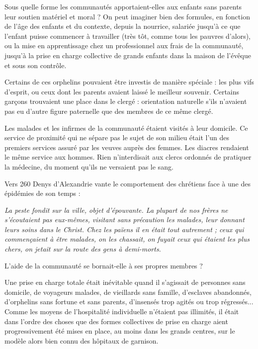  Sous quelle forme les communautés apportaient-elles aux enfants sans parents leur soutien matériel et moral ? On peut imaginer bien des formules, en fonction de l'âge des enfants et du contexte, depuis la nourrice, salariée jusqu'à ce que l'enfant puisse commencer à travailler (très tôt, comme tous les pauvres d'alors), ou la mise en apprentissage chez un professionnel aux frais de la communauté, jusqu'à la prise en charge collective de grands enfants dans la maison de l'évêque et sous son contrôle. 

 Certains de ces orphelins pouvaient être investis de manière spéciale : les plus vifs d'esprit, ou ceux dont les parents avaient laissé le meilleur souvenir. Certains garçons trouvaient une place dans le clergé : orientation naturelle s'ils n'avaient pas eu d'autre figure paternelle que des membres de ce même clergé.



Les malades et les infirmes de la communauté étaient visités à leur domicile. Ce service de proximité qui ne sépare pas le sujet de son milieu était l'un des premiers services assuré par les veuves auprès des femmes. Les diacres rendaient le même service aux hommes. Rien n'interdisait aux clercs ordonnés de pratiquer la médecine, du moment qu'ils ne versaient pas le sang. 

Vers 260 Denys d'Alexandrie vante le comportement des chrétiens face à une des épidémies de son temps : 

\begin{displayquote}
\emph{La peste fondit sur la ville, objet d'épouvante. La plupart de nos frères ne s'écoutaient pas eux-mêmes, visitant sans précaution les malades, leur donnant leurs soins dans le Christ. Chez les païens il en était tout autrement ; ceux qui commençaient à être malades, on les chassait, on fuyait ceux qui étaient les plus chers, on jetait sur la route des gens à demi-morts.}
\end{displayquote}

L'aide de la communauté se bornait-elle à ses propres membres ? 

 Une prise en charge totale était inévitable quand il s'agissait de personnes sans domicile, de voyageurs malades, de vieillards sans famille, d'esclaves abandonnés, d'orphelins sans fortune et sans parents, d'insensés trop agités ou trop régressés... Comme les moyens de l'hospitalité individuelle n'étaient pas illimités, il était dans l'ordre des choses que des formes collectives de prise en charge aient progressivement été mises en place, au moins dans les grands centres, sur le modèle alors bien connu des hôpitaux de garnison. 




